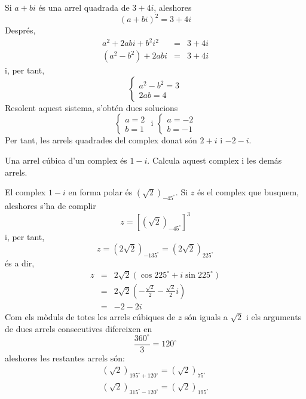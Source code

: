 \begin{solucio}
Si $a+bi$ és una arrel quadrada de $3+4i$, aleshores
\[
(a+bi)^{2}=3+4i
\]
Després,
\begin{eqnarray*}
a^{2}+2abi+b^{2}i^{2} &=&3+4i \\
(a^{2}-b^{2})+2abi &=&3+4i
\end{eqnarray*}
i, per tant,
\[
\left\{
\begin{array}{l}
a^{2}-b^{2}=3 \\
2ab=4
\end{array}
\right.
\]
Resolent aquest sistema, s’obtén dues solucions
\[
\left\{
\begin{array}{l}
a=2 \\
b=1
\end{array}
\right. \text{ \ \ \ i \ \ \ }\left\{
\begin{array}{l}
a=-2 \\
b=-1
\end{array}
\right.
\]
Per tant, les arrels quadrades del complex donat són $2+i$ i $
-2-i$.
\end{solucio}

\begin{exercici}
Una arrel cúbica d’un complex és $1-i$. Calcula aquest complex i
les demás arrels.
\end{exercici}

\begin{solucio}
El complex $1-i$ en forma polar és $\left( \sqrt{2}\right) _{-45
^{\circ}
}$. Si $z$ és el complex que busquem, aleshores s’ha de complir
\[
z=\left[ \left( \sqrt{2}\right) _{-45
^{\circ}
}\right] ^{3}
\]
i, per tant,
\[
z=\left( 2\sqrt{2}\right) _{-135
^{\circ}
}=\left( 2\sqrt{2}\right) _{225
^{\circ}
}
\]
és a dir,
\begin{eqnarray*}
z &=&2\sqrt{2}(\cos 225
^{\circ}
+i\sin 225
^{\circ}
) \\
&=&2\sqrt{2}\left( -\frac{\sqrt{2}}{2}-\frac{\sqrt{2}}{2}i\right) \\
&=&-2-2i
\end{eqnarray*}
Com els mòduls de totes les arrels cúbiques de $z$ són iguals
a $\sqrt{2}$ i els arguments de dues arrels consecutives difereixen en
\[
\frac{360
^{\circ}
}{3}=120
^{\circ}
\]
aleshores les restantes arrels són:
\[
\begin{array}{l}
\left( \sqrt{2}\right) _{195
^{\circ}
+120
^{\circ}
}=\left( \sqrt{2}\right) _{75
^{\circ}
} \\
\left( \sqrt{2}\right) _{315
^{\circ}
-120
^{\circ}
}=\left( \sqrt{2}\right) _{195
^{\circ}
}
\end{array}
\]
\end{solucio}

